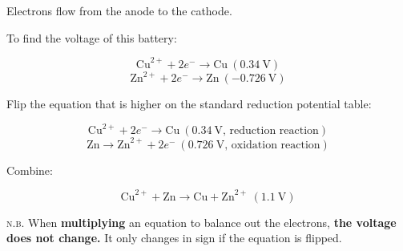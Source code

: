 \documentclass[a4paper, 12pt]{article}
\begin{document}
Electrons flow from the anode to the cathode.

To find the voltage of this battery:

$$\text{Cu}^{2+} + 2e^- \longrightarrow \text{Cu} \: (0.34 \: \text{V})$$
$$\text{Zn}^{2+} + 2e^- \longrightarrow \text{Zn} \: (-0.726 \: \text{V})$$

Flip the equation that is higher on the standard reduction potential table:

$$\text{Cu}^{2+} + 2e^- \longrightarrow \text{Cu} \: (0.34 \: \text{V, reduction reaction})$$
$$\text{Zn} \longrightarrow \text{Zn}^{2+} + 2e^- \: (0.726 \: \text{V, oxidation reaction})$$

Combine:

$$\text{Cu}^{2+} + \text{Zn} \longrightarrow \text{Cu} + \text{Zn}^{2+} \: \boxed{(1.1 \: \text{V})}$$

\textsc{n.b.} When \textbf{multiplying} an equation to balance out the electrons, \textbf{the voltage does not change.} It only changes in sign if the equation is flipped.
\end{document}
